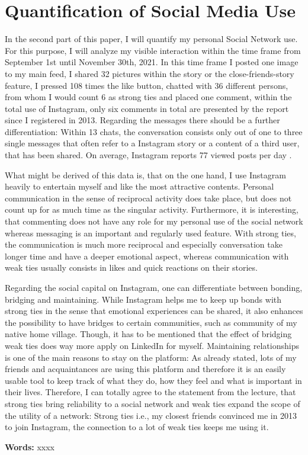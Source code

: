 \documentclass[11pt,letterpaper]{article}
\begin{document}
\section*{Quantification of Social Media Use}
In the second part of this paper, I will quantify my personal Social Network use. For this purpose, I will analyze my visible interaction within the time frame from September 1st until November 30th, 2021. In this time frame I posted one image to my main feed, I shared 32 pictures within the story or the close-friends-story feature, I pressed 108 times the like button, chatted with 36 different persons, from whom I would count 6 as strong ties and placed one comment, within the total use of Instagram, only six comments in total are presented by the report since I registered in 2013. Regarding the messages there should be a further differentiation: Within 13 chats, the conversation consists only out of one to three single messages that often refer to a Instagram story or a content of a third user, that has been shared. On average, Instagram reports 77 viewed posts per day \autocite[][]{Instagram.2021}. 

What might be derived of this data is, that on the one hand, I use Instagram heavily to entertain myself and like the most attractive contents. Personal communication in the sense of reciprocal activity does take place, but does not count up for as much time as the singular activity. Furthermore, it is interesting, that commenting does not have any role for my personal use of the social network whereas messaging is an important and regularly used feature. With strong ties, the communication is much more reciprocal and especially conversation take longer time and have a deeper emotional aspect, whereas communication with weak ties usually consists in likes and quick reactions on their stories.

Regarding the social capital on Instagram, one can differentiate between bonding, bridging and maintaining. While Instagram helps me to keep up bonds with strong ties in the sense that emotional experiences can be shared, it also enhances the possibility to have bridges to certain communities, such as community of my native home village. Though, it has to be mentioned that the effect of bridging weak ties does way more apply on LinkedIn for myself. Maintaining relationships is one of the main reasons to stay on the platform: As already stated, lots of my friends and acquaintances are using this platform and therefore it is an easily usable tool to keep track of what they do, how they feel and what is important in their lives. Therefore, I can totally agree to the statement from the lecture, that strong ties bring reliability to a social network and weak ties expand the scope of the utility of a network: Strong ties i.e., my closest friends convinced me in 2013 to join Instagram, the connection to a lot of weak ties keeps me using it.


\noindent \textbf{Words:} xxxx

\printbibliography

\newpage
\end{document}
